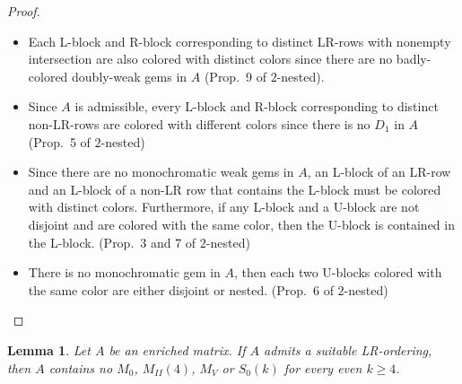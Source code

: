 \documentclass[12pt]{book}
\theoremstyle{plain}
\newtheorem{lema}[teo]{Lemma}
\theoremstyle{remark}
\begin{document}
\begin{proof}
\begin{enumerate}
\begin{itemize}
	\item Each L-block and R-block corresponding to distinct LR-rows with nonempty intersection are also colored with distinct colors since there are no badly-colored doubly-weak gems in $A$ (Prop.\ 9 of $2$-nested).
	
	\item Since $A$ is admissible, every L-block and R-block corresponding to distinct non-LR-rows are colored with different colors since there is no $D_1$ in $A$ (Prop.\ 5 of $2$-nested)
	
	\item Since there are no monochromatic weak gems in $A$, an L-block of an LR-row and an L-block of a non-LR row that contains the L-block must be colored with distinct colors. Furthermore, if any L-block and a U-block are not disjoint and are colored with the same color, then the U-block is contained in the L-block. (Prop.\ 3 and 7 of $2$-nested)
	
	\item There is no monochromatic gem in $A$, then each two U-blocks colored with the same color are either disjoint or nested. (Prop.\ 6 of $2$-nested)
	\end{itemize}
\end{enumerate}
 

\end{proof}

\begin{lema} \label{lema:if_suitable_noM}
Let $A$ be an enriched matrix. If $A$ admits a suitable LR-ordering, then $A$ contains no $M_0$, $M_{II}(4)$, $M_V$ or $S_0(k)$ for every even $k \geq 4$. %
\end{lema}
\end{document}

